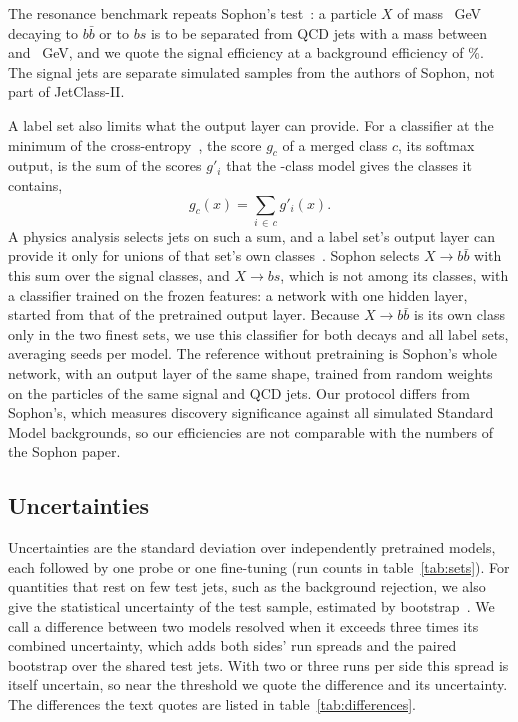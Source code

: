 The resonance benchmark repeats Sophon's test~\cite{sophon}: a particle $X$ of mass \XbxMx~GeV decaying to $b\bar b$
or to $bs$ is to be separated from QCD jets with a mass between \XbxWindowLo{} and \XbxWindowHi~GeV, and we quote the
signal efficiency at a background efficiency of \VXbxEpsB\%.
The signal jets are separate simulated samples from the authors of Sophon, not part of JetClass-II.

A label set also limits what the output layer can provide.
For a classifier at the minimum of the cross-entropy~\cite{richard}, the score $g_c$ of a merged class $c$, its softmax
output, is the sum of the scores $g'_i$ that the \Kfull-class model gives the classes it contains,
\begin{equation}
  g_c(x) = \sum_{i\,\in\, c} g'_i(x) .
  \label{eq:sum}
\end{equation}
A physics analysis selects jets on such a sum, and a label set's output layer can provide it only for unions of that
set's own classes~\cite{sophon}.
Sophon selects $X\to b\bar b$ with this sum over the signal classes, and $X\to bs$, which is not among its
classes, with a classifier trained on the frozen features: a network with one hidden layer, started from that of the
pretrained output layer.
Because $X\to b\bar b$ is its own class only in the two finest sets, we use this classifier for both decays and all
label sets, averaging \MlstXbxHeadSeedsWord{} seeds per model.
The reference without pretraining is Sophon's whole network, with an output layer of the same shape, trained from
random weights on the particles of the same signal and QCD jets.
Our protocol differs from Sophon's, which measures discovery significance against all simulated Standard Model
backgrounds, so our efficiencies are not comparable with the numbers of the Sophon paper.

\subsection{Uncertainties}\label{sec:uncertainties}
Uncertainties are the standard deviation over independently pretrained models, each followed by one probe or one
fine-tuning (run counts in table~\ref{tab:sets}).
For quantities that rest on few test jets, such as the background rejection, we also give the statistical uncertainty
of the test sample, estimated by bootstrap~\cite{efron}.
We call a difference between two models resolved when it exceeds three times its combined uncertainty, which adds both
sides' run spreads and the paired bootstrap over the shared test jets.
With two or three runs per side this spread is itself uncertain, so near the threshold we quote the difference
and its uncertainty.
The differences the text quotes are listed in table~\ref{tab:differences}.
